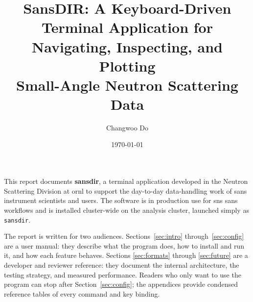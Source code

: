 \documentclass[tm]{ornltm}
\author{Changwoo Do}
\title{SansDIR: A Keyboard-Driven Terminal Application for\\
Navigating, Inspecting, and Plotting\\
Small-Angle Neutron Scattering Data}
\date{\today}
\begin{document}
\frontmatter

\tableofcontents
\listoffigures
\listoftables
\printacronyms

\begin{foreword}

This report documents \textbf{sansdir}, a terminal application developed in the
Neutron Scattering Division at \ac{ornl} to support the day-to-day data-handling
work of \ac{sans} instrument scientists and users. The software is in production
use for \ac{sns} \ac{sans} workflows and is installed cluster-wide on the
analysis cluster, launched simply as \texttt{sansdir}.

The report is written for two audiences. Sections~\ref{sec:intro}
through~\ref{sec:config} are a user manual: they describe what the program does,
how to install and run it, and how each feature behaves. Sections
\ref{sec:formats} through \ref{sec:future} are a developer and reviewer
reference: they document the internal architecture, the testing strategy, and
measured performance. Readers who
only want to use the program can stop after Section~\ref{sec:config}; the
appendices provide condensed reference tables of every command and key binding.

\end{foreword}
\end{document}
